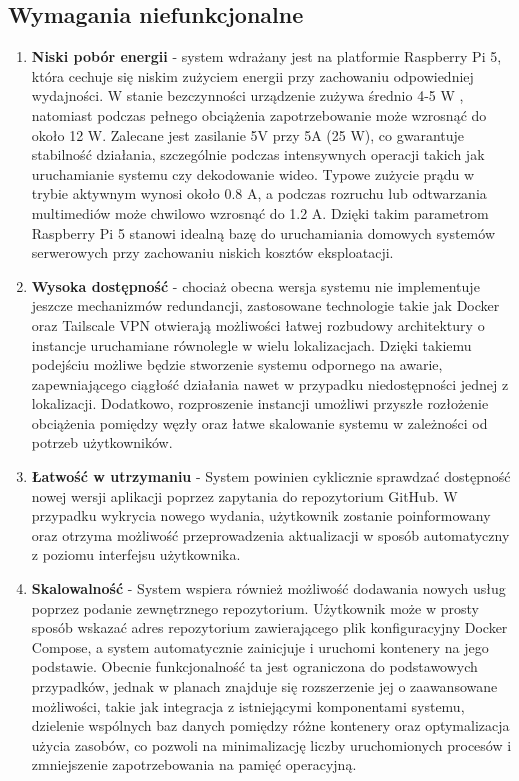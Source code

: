 \subsection{Wymagania niefunkcjonalne}

\begin{enumerate}
    \item \textbf{Niski pobór energii} - system wdrażany jest na platformie Raspberry Pi 5, która cechuje się niskim zużyciem energii przy zachowaniu odpowiedniej wydajności. W stanie bezczynności urządzenie zużywa średnio 4-5 W \cite{RaspberryPiPowerConsumption}, natomiast podczas pełnego obciążenia zapotrzebowanie może wzrosnąć do około 12 W. Zalecane jest zasilanie 5V przy 5A (25 W), co gwarantuje stabilność działania, szczególnie podczas intensywnych operacji takich jak uruchamianie systemu czy dekodowanie wideo. Typowe zużycie prądu w trybie aktywnym wynosi około 0.8 A, a podczas rozruchu lub odtwarzania multimediów może chwilowo wzrosnąć do 1.2 A. Dzięki takim parametrom Raspberry Pi 5 stanowi idealną bazę do uruchamiania domowych systemów serwerowych przy zachowaniu niskich kosztów eksploatacji.
    \item \textbf{Wysoka dostępność} - chociaż obecna wersja systemu nie implementuje jeszcze mechanizmów redundancji, zastosowane technologie takie jak Docker oraz Tailscale VPN otwierają możliwości łatwej rozbudowy architektury o instancje uruchamiane równolegle w wielu lokalizacjach. Dzięki takiemu podejściu możliwe będzie stworzenie systemu odpornego na awarie, zapewniającego ciągłość działania nawet w przypadku niedostępności jednej z lokalizacji. Dodatkowo, rozproszenie instancji umożliwi przyszłe rozłożenie obciążenia pomiędzy węzły oraz łatwe skalowanie systemu w zależności od potrzeb użytkowników.
    \item \textbf{Łatwość w utrzymaniu} - System powinien cyklicznie sprawdzać dostępność nowej wersji aplikacji poprzez zapytania do repozytorium GitHub. W przypadku wykrycia nowego wydania, użytkownik zostanie poinformowany oraz otrzyma możliwość przeprowadzenia aktualizacji w sposób automatyczny z poziomu interfejsu użytkownika.
    \item \textbf{Skalowalność} - System wspiera również możliwość dodawania nowych usług poprzez podanie zewnętrznego repozytorium. Użytkownik może w prosty sposób wskazać adres repozytorium zawierającego plik konfiguracyjny Docker Compose, a system automatycznie zainicjuje i uruchomi kontenery na jego podstawie. Obecnie funkcjonalność ta jest ograniczona do podstawowych przypadków, jednak w planach znajduje się rozszerzenie jej o zaawansowane możliwości, takie jak integracja z istniejącymi komponentami systemu, dzielenie wspólnych baz danych pomiędzy różne kontenery oraz optymalizacja użycia zasobów, co pozwoli na minimalizację liczby uruchomionych procesów i zmniejszenie zapotrzebowania na pamięć operacyjną.

\end{enumerate}
